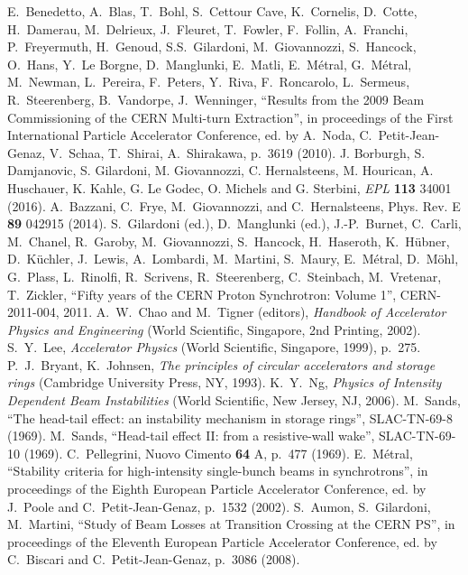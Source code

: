 \documentclass{article}
\begin{document}
\begin{thebibliography}{99}
%
 E.~Benedetto, A.~Blas, T.~Bohl, S.~Cettour Cave, K.~Cornelis, D.~Cotte, H.~Damerau, M.~Delrieux, J.~Fleuret, T.~Fowler, F.~Follin, A.~Franchi, P.~Freyermuth, H.~Genoud, S.S.~Gilardoni, M.~Giovannozzi, S.~Hancock, O.~Hans, Y.~Le Borgne, D.~Manglunki, E.~Matli, E.~M\'etral, G.~M\'etral, M.~Newman, L.~Pereira, F.~Peters, Y.~Riva, F.~Roncarolo, L.~Sermeus, R.~Steerenberg, B.~Vandorpe, J.~Wenninger, ``Results from the 2009 Beam Commissioning of the CERN Multi-turn Extraction'', in proceedings of the First International Particle Accelerator Conference, ed. by A.~Noda, C.~Petit-Jean-Genaz, V.~Schaa, T.~Shirai, A.~Shirakawa, p.~3619 (2010).
%
 J. Borburgh, S. Damjanovic, S. Gilardoni, M. Giovannozzi, C. Hernalsteens, M. Hourican, A. Huschauer, K. Kahle, G. Le Godec, O. Michels and G. Sterbini, {\sl EPL} {\bf 113} 34001 (2016).
%
 A.~Bazzani, C.~Frye, M.~Giovannozzi, and C.~Hernalsteens, Phys. Rev. E {\bf 89} 042915 (2014).
%
 S.~Gilardoni (ed.), D.~Manglunki (ed.), J.-P.~Burnet, C.~Carli, M.~Chanel, R.~Garoby, M.~Giovannozzi, S.~Hancock, H.~Haseroth, K.~H\"ubner, D.~K\"uchler, J.~Lewis, A.~Lombardi, M.~Martini, S.~Maury, E.~M\'etral, D.~M\"ohl, G.~Plass, L.~Rinolfi, R.~Scrivens, R.~Steerenberg, C.~Steinbach, M.~Vretenar, T.~Zickler, ``Fifty years of the CERN Proton Synchrotron: Volume 1'', CERN-2011-004, 2011. 
%
 A.~W.~Chao and M.~Tigner (editors), {\sl Handbook of Accelerator Physics and Engineering} (World Scientific, Singapore, 2nd Printing, 2002).
%
 S.~Y.~Lee, {\sl Accelerator Physics} (World Scientific, Singapore, 1999), p.~275.
%
 P.~J.~Bryant, K.~Johnsen, {\sl The principles of circular accelerators and storage rings} (Cambridge University Press, NY, 1993).
%
 K.~Y.~Ng, {\sl Physics of Intensity Dependent Beam Instabilities} (World Scientific, New Jersey, NJ, 2006).
%
 M.~Sands, ``The head-tail effect: an instability mechanism in storage rings'', SLAC-TN-69-8 (1969).
%
 M.~Sands, ``Head-tail effect II: from a resistive-wall wake'', SLAC-TN-69-10 (1969).
%
 C.~Pellegrini, Nuovo Cimento {\bf 64} A, p.~477 (1969).
%
 E.~M\'etral, ``Stability criteria for high-intensity single-bunch beams in synchrotrons'', in proceedings of the Eighth European Particle Accelerator Conference, ed. by J.~Poole and C.~Petit-Jean-Genaz, p.~1532 (2002).
%
 S.~Aumon, S.~Gilardoni, M.~Martini, ``Study of Beam Losses at Transition Crossing at the CERN PS'', in proceedings of the Eleventh European Particle Accelerator Conference, ed. by C.~Biscari and C.~Petit-Jean-Genaz, p.~3086 (2008).

\end{thebibliography}
\end{document}

